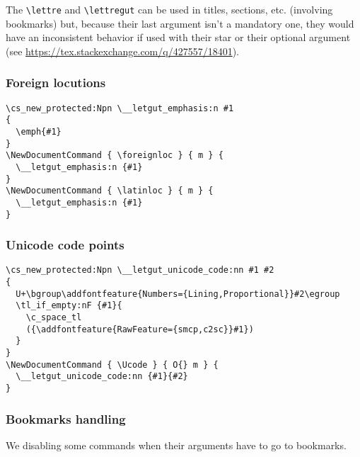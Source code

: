 \documentclass{letgut}
\begin{document}
The \lstinline+\lettre+ and \lstinline+\lettregut+ can be used in titles, sections, etc. (involving
bookmarks) but, because their last argument isn't a mandatory one, they would
have an inconsistent behavior if used with their star or their optional
argument (see \url{https://tex.stackexchange.com/q/427557/18401}).

\subsubsection{Foreign locutions}
\label{ImplementationDocumentcommandsForeignlocutions-1svg55h0jlj0}
\begin{lstlisting}
\cs_new_protected:Npn \__letgut_emphasis:n #1
{
  \emph{#1}
}
\NewDocumentCommand { \foreignloc } { m } {
  \__letgut_emphasis:n {#1}
}
\NewDocumentCommand { \latinloc } { m } {
  \__letgut_emphasis:n {#1}
}
\end{lstlisting}

\subsubsection{Unicode code points}
\label{ImplementationDocumentcommandsUnicodecodes-30lksfa0nlj0}
\begin{lstlisting}
\cs_new_protected:Npn \__letgut_unicode_code:nn #1 #2
{
  U+\bgroup\addfontfeature{Numbers={Lining,Proportional}}#2\egroup
  \tl_if_empty:nF {#1}{
    \c_space_tl
    ({\addfontfeature{RawFeature={smcp,c2sc}}#1})
  }
}
\NewDocumentCommand { \Ucode } { O{} m } {
  \__letgut_unicode_code:nn {#1}{#2}
}
\end{lstlisting}

\subsubsection{Bookmarks handling}
\label{ImplementationDocumentcommandsBookmarkshandling-zbxg55h0jlj0}
We disabling some commands when their arguments have to go to bookmarks.
\end{document}
